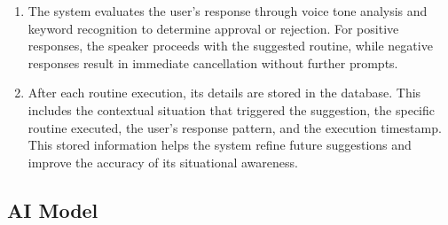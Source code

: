 \documentclass[conference]{IEEEtran}
\begin{document}
\begin{enumerate}[label=\arabic*]
\begin{enumerate}[label=\arabic*)]
        \vspace{0.5em}

        \item The system evaluates the user's response through voice tone analysis and keyword recognition to determine approval or rejection. For positive responses, the speaker proceeds with the suggested routine, while negative responses result in immediate cancellation without further prompts.

        \vspace{0.5em}

        \item After each routine execution, its details are stored in the database. This includes the contextual situation that triggered the suggestion, the specific routine executed, the user's response pattern, and the execution timestamp. This stored information helps the system refine future suggestions and improve the accuracy of its situational awareness.
    \end{enumerate}
    
\end{enumerate}

\vspace{0.7em} %

\subsection{AI Model}
\vspace{0.5em}
\end{document}
